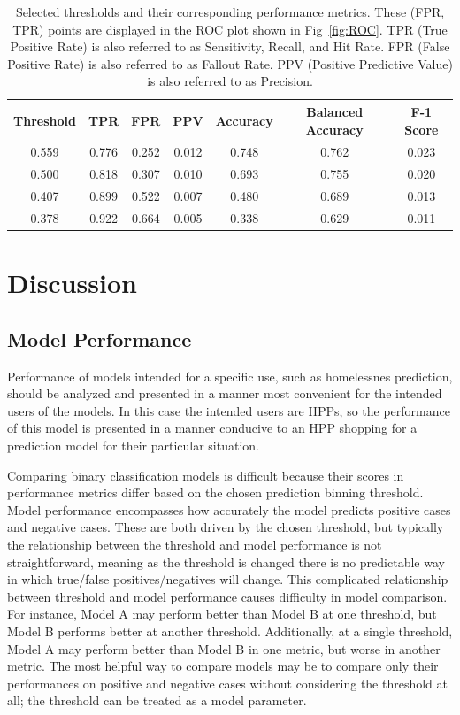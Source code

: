 \documentclass[10pt,letterpaper]{article}
\begin{document}
\begin{table}[htb]
    \centering
    \begin{tabular}{ccccccc}
        \toprule
        Threshold   &   TPR &   FPR & PPV   & Accuracy  &  Balanced Accuracy    & F-1 Score \\
        \midrule
        0.559       & 0.776 & 0.252 & 0.012 &     0.748 &     0.762             & 0.023 \\
        0.500       & 0.818 & 0.307 & 0.010 &     0.693 &     0.755             & 0.020 \\
        0.407       & 0.899 & 0.522 & 0.007 &     0.480 &     0.689             & 0.013 \\
        0.378       & 0.922 & 0.664 & 0.005 &     0.338 &     0.629             & 0.011 \\
        \bottomrule
    \end{tabular}
    \caption{Selected thresholds and their corresponding performance metrics. These (FPR, TPR) points are displayed in the ROC plot shown in Fig~\ref{fig:ROC}. TPR (True Positive Rate) is also referred to as Sensitivity, Recall, and Hit Rate. FPR (False Positive Rate) is also referred to as Fallout Rate. PPV (Positive Predictive Value) is also referred to as Precision.}
    \label{tbl:performance}
\end{table}

\section*{Discussion}
\subsection*{Model Performance}
Performance of models intended for a specific use, such as homelessnes prediction, should be analyzed and presented in a manner most convenient for the intended users of the models. In this case the intended users are HPPs, so the performance of this model is presented in a manner conducive to an HPP shopping for a prediction model for their particular situation.

Comparing binary classification models is difficult because their scores in performance metrics differ based on the chosen prediction binning threshold. Model performance encompasses how accurately the model predicts positive cases and negative cases. These are both driven by the chosen threshold, but typically the relationship between the threshold and model performance is not straightforward, meaning as the threshold is changed there is no predictable way in which true/false positives/negatives will change. This complicated relationship between threshold and model performance causes difficulty in model comparison. For instance, Model A may perform better than Model B at one threshold, but Model B performs better at another threshold. Additionally, at a single threshold, Model A may perform better than Model B in one metric, but worse in another metric. The most helpful way to compare models may be to compare only their performances on positive and negative cases without considering the threshold at all; the threshold can be treated as a model parameter.
\end{document}
